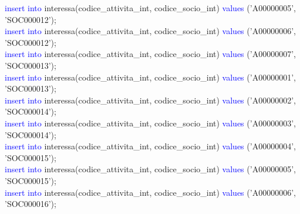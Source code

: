 \documentclass{article}
\begin{document}
\begin{flushleft}
{        \hspace*{0.5em}\textcolor{blue}{insert into} interessa(codice\_attivita\_int, codice\_socio\_int) \textcolor{blue}{values} \hspace*{0.5em}('A00000005', 'SOC000012'); \\
        \hspace*{0.5em}\textcolor{blue}{insert into} interessa(codice\_attivita\_int, codice\_socio\_int) \textcolor{blue}{values} \hspace*{0.5em}('A00000006', 'SOC000012'); \\
        \hspace*{0.5em}\textcolor{blue}{insert into} interessa(codice\_attivita\_int, codice\_socio\_int) \textcolor{blue}{values} \hspace*{0.5em}('A00000007', 'SOC000013'); \\
        \hspace*{0.5em}\textcolor{blue}{insert into} interessa(codice\_attivita\_int, codice\_socio\_int) \textcolor{blue}{values} \hspace*{0.5em}('A00000001', 'SOC000013'); \\
        \hspace*{0.5em}\textcolor{blue}{insert into} interessa(codice\_attivita\_int, codice\_socio\_int) \textcolor{blue}{values} \hspace*{0.5em}('A00000002', 'SOC000014'); \\
        \hspace*{0.5em}\textcolor{blue}{insert into} interessa(codice\_attivita\_int, codice\_socio\_int) \textcolor{blue}{values} \hspace*{0.5em}('A00000003', 'SOC000014'); \\
        \hspace*{0.5em}\textcolor{blue}{insert into} interessa(codice\_attivita\_int, codice\_socio\_int) \textcolor{blue}{values} \hspace*{0.5em}('A00000004', 'SOC000015'); \\
        \hspace*{0.5em}\textcolor{blue}{insert into} interessa(codice\_attivita\_int, codice\_socio\_int) \textcolor{blue}{values} \hspace*{0.5em}('A00000005', 'SOC000015'); \\
        \hspace*{0.5em}\textcolor{blue}{insert into} interessa(codice\_attivita\_int, codice\_socio\_int) \textcolor{blue}{values} \hspace*{0.5em}('A00000006', 'SOC000016'); \\
}
\end{flushleft}
\end{document}
